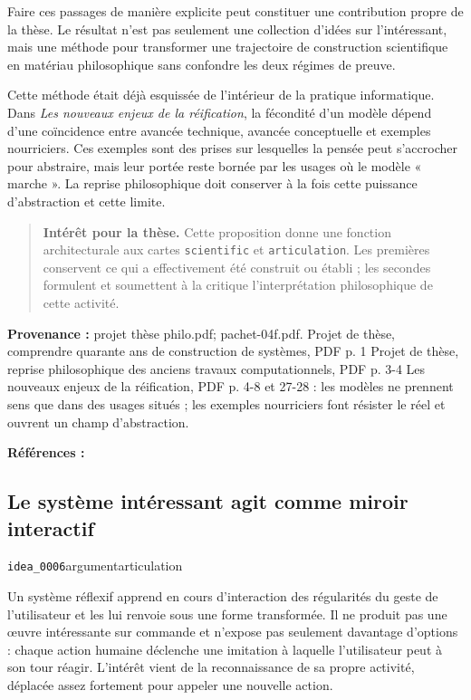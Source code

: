 \documentclass[10pt,a4paper]{article}
\begin{document}
Faire ces passages de manière explicite peut constituer une contribution propre de la thèse. Le résultat n'est pas seulement une collection d'idées sur l'intéressant, mais une méthode pour transformer une trajectoire de construction scientifique en matériau philosophique sans confondre les deux régimes de preuve.

Cette méthode était déjà esquissée de l'intérieur de la pratique informatique. Dans \emph{Les nouveaux enjeux de la réification}, la fécondité d'un modèle dépend d'une coïncidence entre avancée technique, avancée conceptuelle et exemples nourriciers. Ces exemples sont des prises sur lesquelles la pensée peut s'accrocher pour abstraire, mais leur portée reste bornée par les usages où le modèle « marche ». La reprise philosophique doit conserver à la fois cette puissance d'abstraction et cette limite.

\begin{quote}
\textbf{Intérêt pour la thèse.} Cette proposition donne une fonction architecturale aux cartes \texttt{scientific} et \texttt{articulation}. Les premières conservent ce qui a effectivement été construit ou établi ; les secondes formulent et soumettent à la critique l'interprétation philosophique de cette activité.
\end{quote}
{\footnotesize\color{metadata}\textbf{Provenance :} projet thèse philo.pdf; pachet-04f.pdf. Projet de thèse, comprendre quarante ans de construction de systèmes, PDF p. 1 Projet de thèse, reprise philosophique des anciens travaux computationnels, PDF p. 3-4 Les nouveaux enjeux de la réification, PDF p. 4-8 et 27-28 : les modèles ne prennent sens que dans des usages situés ; les exemples nourriciers font résister le réel et ouvrent un champ d'abstraction.\par}
{\footnotesize\color{metadata}\textbf{Références :} \parencite{pachet2004reification}\par}

\subsection{Le système intéressant agit comme miroir interactif}
{\small\color{metadata} \texttt{idea\_0006}\quad\textbullet\quad argument\quad\textbullet\quad articulation\par}

Un système réflexif apprend en cours d'interaction des régularités du geste de l'utilisateur et les lui renvoie sous une forme transformée. Il ne produit pas une œuvre intéressante sur commande et n'expose pas seulement davantage d'options : chaque action humaine déclenche une imitation à laquelle l'utilisateur peut à son tour réagir. L'intérêt vient de la reconnaissance de sa propre activité, déplacée assez fortement pour appeler une nouvelle action.
\end{document}
